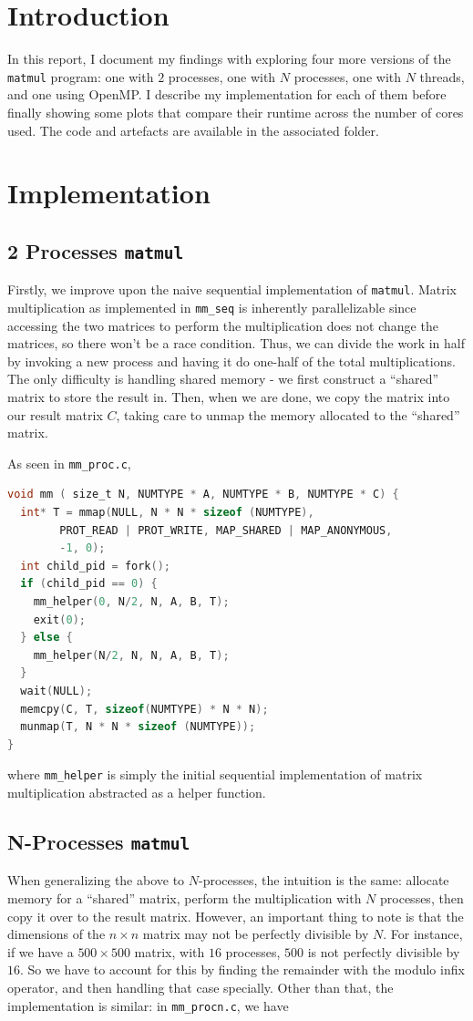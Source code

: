 \documentclass{article}
\begin{document}
\section{Introduction}
In this report, I document my findings with exploring four more versions of the \texttt{matmul} program: one with $2$ processes, one with $N $ processes, one with $N$ threads, and one using OpenMP. I describe my implementation for each of them before finally showing some plots that compare their runtime across the number of cores used. The code and artefacts are available in the associated folder.
\section{Implementation}
\subsection{2 Processes \texttt{matmul}}
Firstly, we improve upon the naive sequential implementation of \texttt{matmul}. Matrix multiplication as implemented in \texttt{mm\_seq} is inherently parallelizable since accessing the two matrices to perform the multiplication does not change the matrices, so there won't be a race condition. Thus, we can divide the work in half by invoking a new process and having it do one-half of the total multiplications. The only difficulty is handling shared memory - we first construct a ``shared'' matrix to store the result in. Then, when we are done, we copy the matrix into our result matrix $C$, taking care to unmap the memory allocated to the ``shared'' matrix.

As seen in \texttt{mm\_proc.c},
\begin{lstlisting}[language=C]
 void mm ( size_t N, NUMTYPE * A, NUMTYPE * B, NUMTYPE * C) {
  int* T = mmap(NULL, N * N * sizeof (NUMTYPE),
		PROT_READ | PROT_WRITE, MAP_SHARED | MAP_ANONYMOUS,
		-1, 0);
  int child_pid = fork();
  if (child_pid == 0) {
    mm_helper(0, N/2, N, A, B, T);
    exit(0);
  } else {
    mm_helper(N/2, N, N, A, B, T);
  }
  wait(NULL);
  memcpy(C, T, sizeof(NUMTYPE) * N * N);
  munmap(T, N * N * sizeof (NUMTYPE));
}  
\end{lstlisting}
where \texttt{mm\_helper} is simply the initial sequential implementation of matrix multiplication abstracted as a helper function.
\subsection{N-Processes \texttt{matmul}}
When generalizing the above to $N$-processes, the intuition is the same: allocate memory for a ``shared'' matrix, perform the multiplication with $N$ processes, then copy it over to the result matrix. However, an important thing to note is that the dimensions of the $n \times n$ matrix may not be perfectly divisible by $N$. For instance, if we have a $500 \times 500$ matrix, with $16$ processes, $500$ is not perfectly divisible by $16$. So we have to account for this by finding the remainder with the modulo infix operator, and then handling that case specially. Other than that, the implementation is similar: in \texttt{mm\_procn.c}, we have
\end{document}

